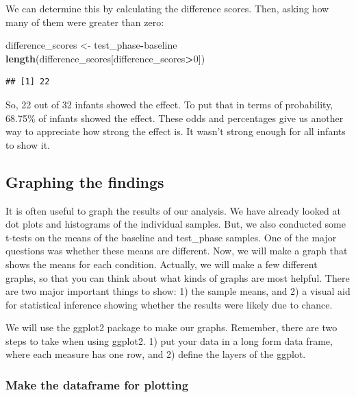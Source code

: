 \documentclass[]{book}
\newenvironment{Shaded}{\begin{snugshade}}{\end{snugshade}}
\newcommand{\KeywordTok}[1]{\textcolor[rgb]{0.13,0.29,0.53}{\textbf{#1}}}
\newcommand{\DecValTok}[1]{\textcolor[rgb]{0.00,0.00,0.81}{#1}}
\newcommand{\StringTok}[1]{\textcolor[rgb]{0.31,0.60,0.02}{#1}}
\newcommand{\OperatorTok}[1]{\textcolor[rgb]{0.81,0.36,0.00}{\textbf{#1}}}
\newcommand{\NormalTok}[1]{#1}
\begin{document}
We can determine this by calculating the difference scores. Then, asking
how many of them were greater than zero:

\begin{Shaded}
\begin{Highlighting}[]
\NormalTok{difference_scores <-}\StringTok{ }\NormalTok{test_phase}\OperatorTok{-}\NormalTok{baseline}
\KeywordTok{length}\NormalTok{(difference_scores[difference_scores}\OperatorTok{>}\DecValTok{0}\NormalTok{])}
\end{Highlighting}
\end{Shaded}

\begin{verbatim}
## [1] 22
\end{verbatim}

So, 22 out of 32 infants showed the effect. To put that in terms of
probability, 68.75\% of infants showed the effect. These odds and
percentages give us another way to appreciate how strong the effect is.
It wasn't strong enough for all infants to show it.

\subsection{Graphing the findings}\label{graphing-the-findings}

It is often useful to graph the results of our analysis. We have already
looked at dot plots and histograms of the individual samples. But, we
also conducted some t-tests on the means of the baseline and test\_phase
samples. One of the major questions was whether these means are
different. Now, we will make a graph that shows the means for each
condition. Actually, we will make a few different graphs, so that you
can think about what kinds of graphs are most helpful. There are two
major important things to show: 1) the sample means, and 2) a visual aid
for statistical inference showing whether the results were likely due to
chance.

We will use the ggplot2 package to make our graphs. Remember, there are
two steps to take when using ggplot2. 1) put your data in a long form
data frame, where each measure has one row, and 2) define the layers of
the ggplot.

\subsubsection{Make the dataframe for
plotting}\label{make-the-dataframe-for-plotting}
\end{document}

